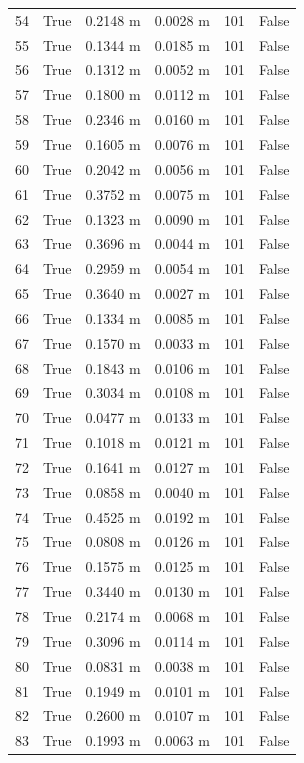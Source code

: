 \documentclass[11pt,a4paper,oneside]{book}
\begin{document}
\begin{longtable}{l l l l l l}
54 & True & 0.2148 m & 0.0028 m & 101 & False \\
55 & True & 0.1344 m & 0.0185 m & 101 & False \\
56 & True & 0.1312 m & 0.0052 m & 101 & False \\
57 & True & 0.1800 m & 0.0112 m & 101 & False \\
58 & True & 0.2346 m & 0.0160 m & 101 & False \\
59 & True & 0.1605 m & 0.0076 m & 101 & False \\
60 & True & 0.2042 m & 0.0056 m & 101 & False \\
61 & True & 0.3752 m & 0.0075 m & 101 & False \\
62 & True & 0.1323 m & 0.0090 m & 101 & False \\
63 & True & 0.3696 m & 0.0044 m & 101 & False \\
64 & True & 0.2959 m & 0.0054 m & 101 & False \\
65 & True & 0.3640 m & 0.0027 m & 101 & False \\
66 & True & 0.1334 m & 0.0085 m & 101 & False \\
67 & True & 0.1570 m & 0.0033 m & 101 & False \\
68 & True & 0.1843 m & 0.0106 m & 101 & False \\
69 & True & 0.3034 m & 0.0108 m & 101 & False \\
70 & True & 0.0477 m & 0.0133 m & 101 & False \\
71 & True & 0.1018 m & 0.0121 m & 101 & False \\
72 & True & 0.1641 m & 0.0127 m & 101 & False \\
73 & True & 0.0858 m & 0.0040 m & 101 & False \\
74 & True & 0.4525 m & 0.0192 m & 101 & False \\
75 & True & 0.0808 m & 0.0126 m & 101 & False \\
76 & True & 0.1575 m & 0.0125 m & 101 & False \\
77 & True & 0.3440 m & 0.0130 m & 101 & False \\
78 & True & 0.2174 m & 0.0068 m & 101 & False \\
79 & True & 0.3096 m & 0.0114 m & 101 & False \\
80 & True & 0.0831 m & 0.0038 m & 101 & False \\
81 & True & 0.1949 m & 0.0101 m & 101 & False \\
82 & True & 0.2600 m & 0.0107 m & 101 & False \\
83 & True & 0.1993 m & 0.0063 m & 101 & False \\

\end{longtable}
\end{document}
